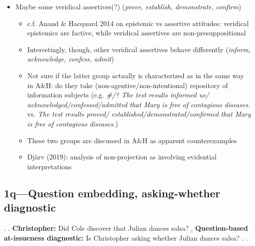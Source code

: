 \documentclass[11pt]{article}
\begin{document}
\begin{itemize}
\begin{itemize}
				\item Maybe some veridical assertives(?) (\emph{prove, \textcolor{gray!50}{establish, demonstrate, confirm}})
				\begin{itemize}
					\item c.f. Anand \& Hacquard 2014 on epistemic vs assertive attitudes: veridical epistemics are factive, while veridical assertives are non-presuppositional
					\item Interestingly, though, other veridical assertives behave differently (\emph{inform, acknowledge, confess, admit})
					\item Not sure if the latter group actually is characterized as in the same way in A\&H: do they take (non-agentive/non-intentional) repository of information subjects (e.g. \emph{\#/? The test results informed us/ acknowledged/confessed/admitted that Mary is free of contagious diseases.} vs. \emph{The test results proved/ established/demonstrated/confirmed that Mary is free of contagious diseases.})
					\item These two groups are discussed in A\&H as apparent counterexamples
					\item Djärv (2019): analysis of non-projection as involving evidential interpretations
				\end{itemize}
			\end{itemize}
		\end{itemize}
	
		
	\pagebreak
	\subsection{1q---Question embedding, asking-whether diagnostic} %
			
			\ex. \a. \textbf{Christopher:} Did Cole discover that Julian dances salsa?
				\b. \textbf{Question-based at-issueness diagnostic:} Is Christopher asking whether Julian dances salsa?
				\z.
			\z.
\end{document}
